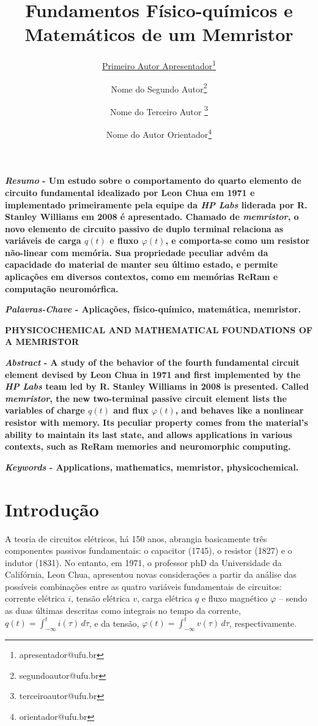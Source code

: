 \documentclass{ceel}
\title{Fundamentos Físico-químicos e Matemáticos de um Memristor}
\author[1]{\underline{Primeiro Autor Apresentador}\thanks{apresentador@ufu.br}}
\author[1]{Nome do Segundo Autor\thanks{segundoautor@ufu.br}}
\author[1]{Nome do Terceiro Autor \thanks{terceiroautor@ufu.br}}
\author[2]{Nome do Autor Orientador\thanks{orientador@ufu.br}}
\affil[1]{FEELT - Universidade Federal de Uberlândia}
\affil[2]{FEELT - Professor Adjunto - Universidade Federal de Uberlândia}
\begin{document}
\inserirtitulo

\begin{multicols}{2}

\textbf{\emph{Resumo} - Um estudo sobre o comportamento do quarto elemento de circuito fundamental idealizado por Leon Chua em 1971 e implementado primeiramente pela equipe da \emph{HP Labs} liderada por R. Stanley Williams em 2008 é apresentado. Chamado de \emph{memristor}, o novo elemento de circuito passivo de duplo terminal relaciona as variáveis de carga $q(t)$ e fluxo $\varphi(t)$, e comporta-se como um resistor não-linear com memória. Sua propriedade peculiar advém da capacidade do material de manter seu último estado, e permite aplicações em diversos contextos, como em memórias ReRam e computação neuromórfica.} %
\vspace*{10pt}

\textbf{\emph{Palavras-Chave} - Aplicações, físico-químico, matemática, memristor.}


\begin{center}

\noindent\textbf{\large \uppercase{Physicochemical and Mathematical Foundations of a Memristor}}
\end{center}

\textbf{\emph{Abstract} - A study of the behavior of the fourth fundamental circuit element devised by Leon Chua in 1971 and first implemented by the \emph{HP Labs} team led by R. Stanley Williams in 2008 is presented. Called \emph {memristor}, the new two-terminal passive circuit element lists the variables of charge $q(t)$ and flux $\varphi(t)$, and behaves like a nonlinear resistor with memory. Its peculiar property comes from the material's ability to maintain its last state, and allows applications in various contexts, such as ReRam memories and neuromorphic computing.}
\vspace*{10pt}

\textbf{\emph{Keywords} - Applications, mathematics, memristor, physicochemical.}


\section{Introdução}
A teoria de circuitos elétricos, há 150 anos, abrangia basicamente três componentes passivos fundamentais: o capacitor (1745), o resistor (1827) e o indutor (1831). No entanto, em 1971, o professor phD da Universidade da Califórnia, Leon Chua, apresentou novas considerações a partir da análise das possíveis combinações entre as quatro variáveis fundamentais de circuitos: corrente elétrica $i$, tensão elétrica $v$, carga elétrica $q$ e fluxo magnético $\varphi$ – sendo as duas últimas descritas como integrais no tempo da corrente, $q(t)=\int_{-\infty}^t i(\tau)\, d\tau$, e da tensão, $\varphi(t)=\int_{-\infty}^t v(\tau)\, d\tau$, respectivamente.


\end{multicols}
\end{document}
